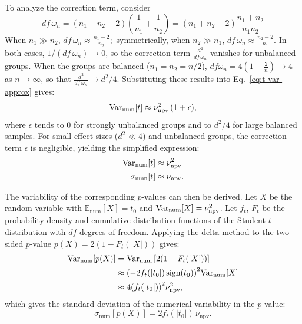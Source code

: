 \vspace{0.5em}
\noindent
To analyze the correction term, consider
\begin{equation*}
    df\,\omega_n = (n_1 + n_2 - 2)
    \left(\frac{1}{n_1} + \frac{1}{n_2}\right)
    = (n_1 + n_2 - 2)\frac{n_1 + n_2}{n_1 n_2}
    \label{eq:df-omega-analysis}
\end{equation*}
When $n_1 \gg n_2$,
\(
df\,\omega_n \approx \tfrac{n_1 - 2}{n_2};
\)
symmetrically, when $n_2 \gg n_1$,
\(
df\,\omega_n \approx \tfrac{n_2 - 2}{n_1}.
\)
In both cases, $1/(df\,\omega_n) \to 0$, so the correction term
\(\tfrac{d^2}{df\,\omega_n}\) vanishes for unbalanced groups. When the groups
are balanced ($n_1 = n_2 = n/2$), $df \omega_n = 4\!\left(1 -
    \tfrac{2}{n}\right) \to 4$ as $n \to \infty$, so that $\tfrac{d^2}{df\,\omega_n}
    \to d^2 / 4$. Substituting these results into Eq.~\eqref{eq:t-var-approx} gives:
\begin{equation*}
    \mathrm{Var}_{\mathrm{num}}[t]
    \approx
    \nu_{\mathrm{npv}}^{2}\,(1 + \epsilon),
    \label{eq:t-var-final}
\end{equation*}
where $\epsilon$ tends to $0$ for strongly unbalanced groups and to $d^{2}/4$
for large balanced samples. For small effect sizes ($d^2 \ll 4$) and unbalanced
groups, the correction term $\epsilon$ is negligible, yielding the simplified
expression:
\begin{align*}
    \mathrm{Var}_{\mathrm{num}}[t]   & \approx \nu_{\mathrm{npv}}^{2} \notag \\
    \sigma_{\mathrm{num}}[t] & \approx \nu_{\mathrm{npv}}.
    \label{eq:t-var-simplified}
\end{align*}

\vspace{0.5em}
\noindent
The variability of the corresponding $p$-values can then be derived. Let $X$ be
the random variable with $\mathbb{E}_{\mathrm{num}}[X]=t_0$ and
$\mathrm{Var}_{\mathrm{num}}[X]=\nu_{\mathrm{npv}}^{2}$. Let $f_t$, $F_t$ be the
probability density and cumulative distribution functions of the Student
$t$-distribution with $df$ degrees of freedom. Applying the delta method to the
two-sided $p$-value $p(X) = 2\left(1 - F_t(|X|)\right)$ gives:
\begin{align*}
    \mathrm{Var}_{\mathrm{num}}[p(X)] & = \mathrm{Var}_{\mathrm{num}}\left[2(1 - F_t(|X|))\right]                             \notag     \\
                              & \approx {\left(-2f_t(|t_0|)\,\mathrm{sign}(t_0)\right)}^{2}\mathrm{Var}_{\mathrm{num}}[X] \notag \\
                              & \approx 4{\left(f_t(|t_0|)\right)}^{2}\nu_{\mathrm{npv}}^{2},
\end{align*}
which gives the standard deviation of the numerical variability in the
$p$-value:
\begin{equation*}
    \sigma_{\mathrm{num}}[p(X)] = 2f_t(|t_0|)\,\nu_{\mathrm{npv}}.
    \label{eq:p-std}
\end{equation*}

